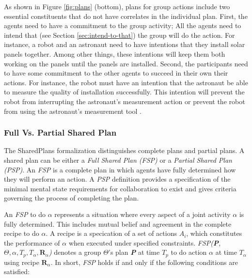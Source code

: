 \documentclass[12pt]{report}
\begin{document}
As shown in Figure \ref{fig:plans} (bottom), plans for group actions include two
essential constituents that do not have correlates in the individual plan.
First, the agents need to have a commitment to the group activity; All the
agents need to intend that (see Section \ref{sec:intend-to-that}) the group will
do the action. For instance, a robot and an astronaut need to have intentions
that they install solar panels together. Among other things, these intentions
will keep them both working on the panels until the panels are installed.
Second, the participants need to have some commitment to the other agents to
succeed in their own their actions. For instance, the robot must have an
intention that the astronaut be able to measure the quality of installation
successfully. This intention will prevent the robot from interrupting the
astronaut's measurement action or prevent the robot from using the astronaut's
measurement tool \cite{grosz:collaborative-systems, grosz:plans-discourse}.

\subsubsection{Full Vs. Partial Shared Plan}
\label{sec:full-partial-plan}

The SharedPlans formalization distinguishes complete plans and partial plans. A
shared plan can be either a \textit{Full Shared Plan (FSP)} or a \textit{Partial
Shared Plan (PSP)}. An \textit{FSP} is a complete plan in which agents have fully
determined how they will perform an action. A \textit{PSP} definition provides a
specification of the minimal mental state requirements for collaboration to
exist and gives criteria governing the process of completing the plan. 

An \textit{FSP} to do $\alpha$ represents a situation where every aspect of a
joint activity $\alpha$ is fully determined. This includes mutual belief and
agreement in the complete recipe to do $\alpha$. A recipe is a specication of a
set of actions \textit{$A_i$}, which constitutes the performance of $\alpha$
when executed under specified constraints. \textit{FSP(\textbf{P}, $\Theta,
\alpha, T_p, T_\alpha, \textbf{R}_\alpha$)} denotes a group $\Theta$'s plan
\textit{\textbf{P}} at time \textit{$T_p$} to do action $\alpha$ at time
\textit{$T_\alpha$} using recipe \textit{$\textbf{R}_\alpha$}. In short,
\textit{FSP} holds if and only if the following conditions are satisfied:
\end{document}
